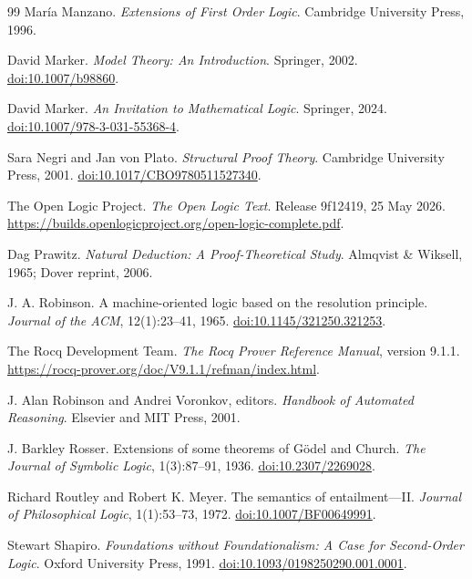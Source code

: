 \documentclass[11pt,oneside,openany]{book}
\theoremstyle{definition}
\theoremstyle{plain}
\theoremstyle{remark}
\begin{document}
\begin{thebibliography}{99}
Mar\'ia Manzano.
\emph{Extensions of First Order Logic}.
Cambridge University Press, 1996.

David Marker.
\emph{Model Theory: An Introduction}.
Springer, 2002.
\href{https://doi.org/10.1007/b98860}{doi:10.1007/b98860}.

David Marker.
\emph{An Invitation to Mathematical Logic}.
Springer, 2024.
\href{https://doi.org/10.1007/978-3-031-55368-4}{doi:10.1007/978-3-031-55368-4}.

Sara Negri and Jan von Plato.
\emph{Structural Proof Theory}.
Cambridge University Press, 2001.
\href{https://doi.org/10.1017/CBO9780511527340}{doi:10.1017/CBO9780511527340}.

The Open Logic Project.
\emph{The Open Logic Text}.
Release 9f12419, 25 May 2026.
\url{https://builds.openlogicproject.org/open-logic-complete.pdf}.

Dag Prawitz.
\emph{Natural Deduction: A Proof-Theoretical Study}.
Almqvist \& Wiksell, 1965; Dover reprint, 2006.

J. A. Robinson.
A machine-oriented logic based on the resolution principle.
\emph{Journal of the ACM}, 12(1):23--41, 1965.
\href{https://doi.org/10.1145/321250.321253}{doi:10.1145/321250.321253}.

The Rocq Development Team.
\emph{The Rocq Prover Reference Manual}, version 9.1.1.
\url{https://rocq-prover.org/doc/V9.1.1/refman/index.html}.

J. Alan Robinson and Andrei Voronkov, editors.
\emph{Handbook of Automated Reasoning}.
Elsevier and MIT Press, 2001.

J. Barkley Rosser.
Extensions of some theorems of G\"odel and Church.
\emph{The Journal of Symbolic Logic}, 1(3):87--91, 1936.
\href{https://doi.org/10.2307/2269028}{doi:10.2307/2269028}.

Richard Routley and Robert K. Meyer.
The semantics of entailment---II.
\emph{Journal of Philosophical Logic}, 1(1):53--73, 1972.
\href{https://doi.org/10.1007/BF00649991}{doi:10.1007/BF00649991}.

Stewart Shapiro.
\emph{Foundations without Foundationalism: A Case for Second-Order Logic}.
Oxford University Press, 1991.
\href{https://doi.org/10.1093/0198250290.001.0001}{doi:10.1093/0198250290.001.0001}.


\end{thebibliography}
\end{document}
